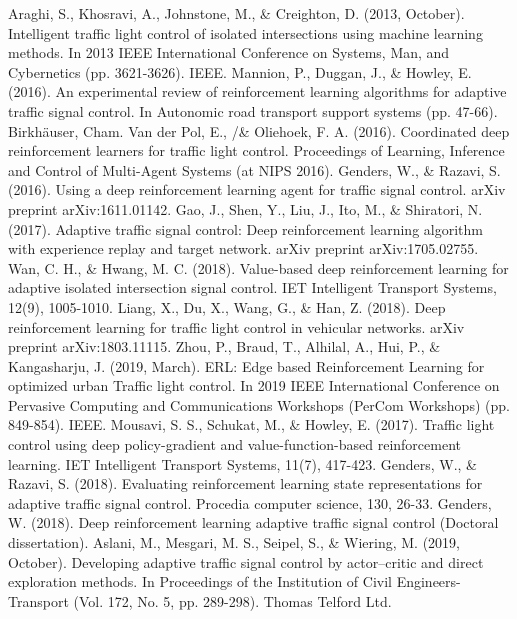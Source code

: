 \documentclass{article}
\begin{document}
\begin{thebibliography}{00}
 Araghi, S., Khosravi, A., Johnstone, M., \& Creighton, D. (2013, October). Intelligent traffic light control of isolated intersections using machine learning methods. In 2013 IEEE International Conference on Systems, Man, and Cybernetics (pp. 3621-3626). IEEE.
 Mannion, P., Duggan, J., \& Howley, E. (2016). An experimental review of reinforcement learning algorithms for adaptive traffic signal control. In Autonomic road transport support systems (pp. 47-66). Birkhäuser, Cham.
 Van der Pol, E., /\& Oliehoek, F. A. (2016). Coordinated deep reinforcement learners for traffic light control. Proceedings of Learning, Inference and Control of Multi-Agent Systems (at NIPS 2016).
 Genders, W., \& Razavi, S. (2016). Using a deep reinforcement learning agent for traffic signal control. arXiv preprint arXiv:1611.01142.
 Gao, J., Shen, Y., Liu, J., Ito, M., \& Shiratori, N. (2017). Adaptive traffic signal control: Deep reinforcement learning algorithm with experience replay and target network. arXiv preprint arXiv:1705.02755.
 Wan, C. H., \& Hwang, M. C. (2018). Value-based deep reinforcement learning for adaptive isolated intersection signal control. IET Intelligent Transport Systems, 12(9), 1005-1010.
 Liang, X., Du, X., Wang, G., \& Han, Z. (2018). Deep reinforcement learning for traffic light control in vehicular networks. arXiv preprint arXiv:1803.11115.
 Zhou, P., Braud, T., Alhilal, A., Hui, P., \& Kangasharju, J. (2019, March). ERL: Edge based Reinforcement Learning for optimized urban Traffic light control. In 2019 IEEE International Conference on Pervasive Computing and Communications Workshops (PerCom Workshops) (pp. 849-854). IEEE.
 Mousavi, S. S., Schukat, M., \& Howley, E. (2017). Traffic light control using deep policy-gradient and value-function-based reinforcement learning. IET Intelligent Transport Systems, 11(7), 417-423.
 Genders, W., \& Razavi, S. (2018). Evaluating reinforcement learning state representations for adaptive traffic signal control. Procedia computer science, 130, 26-33.
 Genders, W. (2018). Deep reinforcement learning adaptive traffic signal control (Doctoral dissertation).
 Aslani, M., Mesgari, M. S., Seipel, S., \& Wiering, M. (2019, October). Developing adaptive traffic signal control by actor–critic and direct exploration methods. In Proceedings of the Institution of Civil Engineers-Transport (Vol. 172, No. 5, pp. 289-298). Thomas Telford Ltd.

\end{thebibliography}
\end{document}
